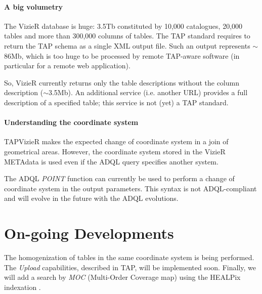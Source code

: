 \paragraph{A big volumetry}

The VizieR database is huge:  3.5Tb constituted by 10,000 catalogues, 20,000 tables and more than 300,000 columns of tables. The TAP standard requires to return the TAP schema as a single XML output file. Such an output represents $\sim$86Mb, which is too huge to be processed by remote TAP-aware software (in particular for a remote web application).

So, VizieR currently returns only the table descriptions without the column description ($\sim$3.5Mb). An additional service (i.e. another URL) provides a full description of a specified table; this service is not (yet) a TAP standard.

\paragraph{Understanding the coordinate system}

TAPVizieR makes the expected change of coordinate system in a join of geometrical  areas. However, the coordinate system stored in the VizieR METAdata is used even if the ADQL query specifies another system.

The ADQL {\em POINT} function can currently be used to perform a change of coordinate system in the output parameters. This syntax is not ADQL-compliant and  will evolve in the future with the ADQL evolutions.

\section{On-going Developments}

The homogenization of tables in the same coordinate system is being performed. The {\em Upload} capabilities, described in TAP, will be implemented soon. Finally, we will add a search by {\em MOC}  (Multi-Order Coverage map) using the HEALPix indexation \citep{O13_adassxxii}.


